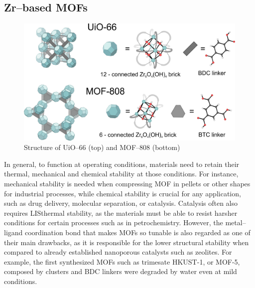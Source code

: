 \subsection*{Zr--based MOFs}
\begin{figure}[!htbp]
	\centering
 	\includegraphics[width=1.0\textwidth]{Zr-MOFs}
	\caption{Structure of UiO--66 (top) and MOF--808 (bottom)}
	\label{fig:Zr-MOFs}
\end{figure}
In general, to function at operating conditions, materials need to retain their thermal, mechanical and chemical stability at those conditions. For instance, mechanical stability is needed when compressing MOF in pellets or other shapes for industrial processes\cite{chapman2009pressure}, while chemical stability is crucial for any application, such as drug delivery, molecular separation, or catalysis\cite{horcajada2010porous}. Catalysis often also requires LISthermal stability, as the materials must be able to resist harsher conditions for certain processes such as in petrochemistry. 
However, the metal--ligand coordination bond that makes MOFs so tunable is also regarded as one of their main drawbacks\cite{keskin2010can, canivet2014water, kizzie2011effect}, as it is responsible for the lower structural stability when compared to already established nanoporous catalysts such as zeolites. For example, the first synthesized MOFs such as  trimesate HKUST-1, or MOF-5, composed by  clusters and BDC linkers were degraded by water even at mild conditions\cite{greathouse2006interaction, low2009virtual, kaye2007impact, decoste2013effect}. 

